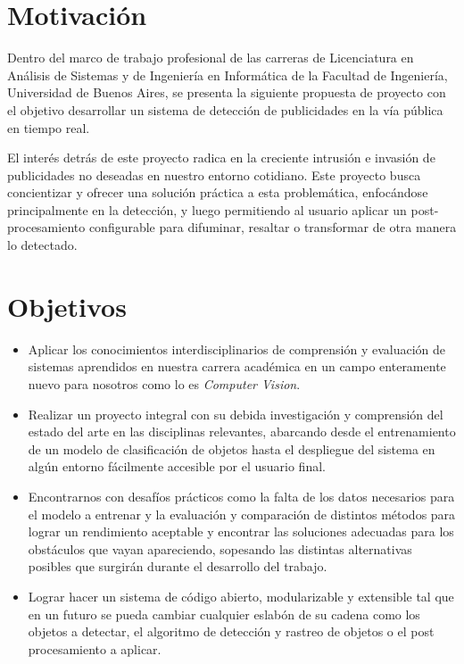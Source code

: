 \documentclass[a4paper]{article}
\begin{document}
\restoregeometry
\tableofcontents
\newpage

\section{Motivación}
Dentro del marco de trabajo profesional de las carreras de Licenciatura en Análisis de Sistemas y de Ingeniería en Informática de la Facultad de Ingeniería, Universidad de Buenos Aires, se presenta la siguiente propuesta de proyecto con el objetivo desarrollar un sistema de detección de publicidades en la vía pública en tiempo real.

El interés detrás de este proyecto radica en la creciente intrusión e invasión de publicidades no deseadas en nuestro entorno cotidiano. Este proyecto busca concientizar y ofrecer una solución práctica a esta problemática, enfocándose principalmente en la detección, y luego permitiendo al usuario aplicar un post-procesamiento configurable para difuminar, resaltar o transformar de otra manera lo detectado.

\section{Objetivos}
\begin{itemize}
    \item Aplicar los conocimientos interdisciplinarios de comprensión y evaluación de sistemas aprendidos en nuestra carrera académica en un campo enteramente nuevo para nosotros como lo es \emph{Computer Vision}.
    \item Realizar un proyecto integral con su debida investigación y comprensión del estado del arte en las disciplinas relevantes, abarcando desde el entrenamiento de un modelo de clasificación de objetos hasta el despliegue del sistema en algún entorno fácilmente accesible por el usuario final.
    \item Encontrarnos con desafíos prácticos como la falta de los datos necesarios para el modelo a entrenar y la evaluación y comparación de distintos métodos para lograr un rendimiento aceptable y encontrar las soluciones adecuadas para los obstáculos que vayan apareciendo, sopesando las distintas alternativas posibles que surgirán durante el desarrollo del trabajo.
    \item Lograr hacer un sistema de código abierto, modularizable y extensible tal que en un futuro se pueda cambiar cualquier eslabón de su cadena como los objetos a detectar, el algoritmo de detección y rastreo de objetos o el post procesamiento a aplicar.
\end{itemize}
\end{document}
